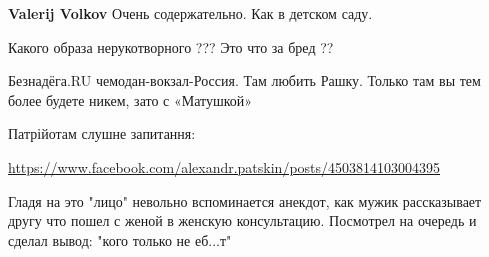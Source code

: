 \begin{itemize}
\begin{itemize}
 
\textbf{Valerij Volkov} Очень содержательно. Как в детском саду.

\end{itemize}

 
Какого образа нерукотворного ??? Это что за бред ??

 
Безнадёга.RU чемодан-вокзал-Россия. Там любить Рашку. Только там вы тем более будете никем, зато с «Матушкой»🙈

 
Патрійотам слушне запитання:

\url{https://www.facebook.com/alexandr.patskin/posts/4503814103004395}

 
Гладя на это "лицо" невольно вспоминается анекдот, как мужик рассказывает другу
что пошел с женой в женскую консультацию. Посмотрел на очередь и сделал вывод:
"кого только не еб...т"

\begin{itemize}
 

\end{itemize}
\end{itemize}
